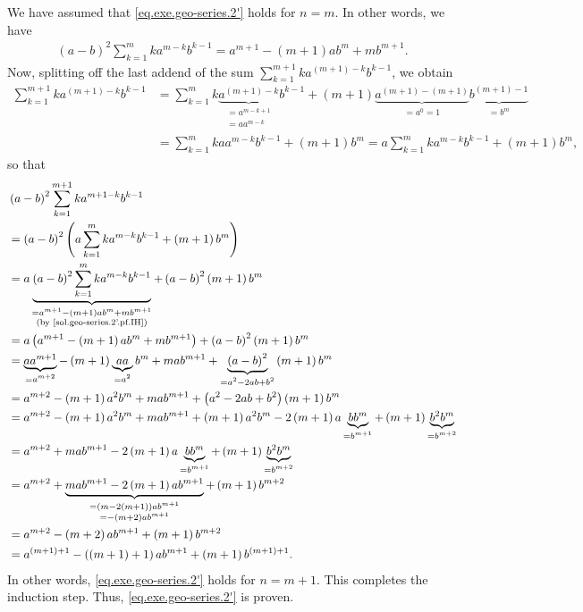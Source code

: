 \documentclass[paper=a4, fontsize=12pt]{scrartcl} %
\newcommand{\tup}[1]{\left( #1 \right)}
\newcommand{\underbrack}[2]{\underbrace{#1}_{\substack{#2}}}
\let\sumnonlimits\sum
\renewcommand{\sum}{\sumnonlimits\limits}
\theoremstyle{plainsl}
\theoremstyle{definition}
\theoremstyle{remark}
\begin{document}
\begin{itemize}
We have assumed that \eqref{eq.exe.geo-series.2'}
holds for $n = m$. In other words, we have
\begin{align}
\tup{a-b}^2 \sum_{k = 1}^m k a^{m-k} b^{k-1}
= a^{m+1} - \tup{m+1} a b^m + m b^{m+1} .
\label{sol.geo-series.2'.pf.IH}
\end{align}
Now, splitting off the last addend of the sum
$\sum_{k = 1}^{m+1} k a^{\tup{m+1}-k} b^{k-1}$, we obtain
\begin{align*}
  \sum_{k = 1}^{m+1} k a^{\tup{m+1}-k} b^{k-1}
& = \sum_{k = 1}^m k \underbrack{a^{\tup{m+1}-k}}{= a^{m-k+1} \\ = a a^{m-k}} b^{k-1}
      + \tup{m+1}
        \underbrack{a^{\tup{m+1}-\tup{m+1}}}{= a^0 = 1}
        \underbrack{b^{\tup{m+1}-1}}{= b^m} \\
& = \sum_{k = 1}^m k a a^{m-k} b^{k-1} + \tup{m+1} b^m
  = a \sum_{k = 1}^m k a^{m-k} b^{k-1} + \tup{m+1} b^m ,
\end{align*}
so that
\begin{align*}
& \tup{a-b}^2 \sum_{k = 1}^{m+1} k a^{{m+1}-k} b^{k-1} \\
& = \tup{a-b}^2 \tup{a \sum_{k = 1}^m k a^{m-k} b^{k-1} + \tup{m+1} b^m} \\
& = a \underbrack{\tup{a-b}^2 \sum_{k = 1}^m k a^{m-k} b^{k-1}}{= a^{m+1} - \tup{m+1} a b^m + m b^{m+1} \\ \text{(by \eqref{sol.geo-series.2'.pf.IH})}}
    + \tup{a-b}^2 \tup{m+1} b^m \\
& = a \tup{a^{m+1} - \tup{m+1} a b^m + m b^{m+1}} + \tup{a-b}^2 \tup{m+1} b^m \\
& = \underbrack{a a^{m+1}}{= a^{m+2}}
    - \tup{m+1} \underbrack{a a}{= a^2} b^m + m a b^{m+1}
    + \underbrack{\tup{a-b}^2}{= a^2 - 2ab + b^2} \tup{m+1} b^m \\
& = a^{m+2} - \tup{m+1} a^2 b^m + m a b^{m+1}
    + \tup{a^2 - 2ab + b^2} \tup{m+1} b^m \\
& = a^{m+2} - \tup{m+1} a^2 b^m + m a b^{m+1}
    + \tup{m+1} a^2 b^m - 2 \tup{m+1} a \underbrack{b b^m}{= b^{m+1}} + \tup{m+1} \underbrack{b^2 b^m}{= b^{m+2}} \\
& = a^{m+2} + m a b^{m+1}
    - 2 \tup{m+1} a \underbrack{b b^m}{= b^{m+1}} + \tup{m+1} \underbrack{b^2 b^m}{= b^{m+2}} \\
& = a^{m+2} + \underbrack{m a b^{m+1} - 2 \tup{m+1} a b^{m+1}}{= \tup{m - 2 \tup{m+1}} a b^{m+1} \\ = - \tup{m+2} a b^{m+1} } + \tup{m+1} b^{m+2} \\
& = a^{m+2} - \tup{m+2} a b^{m+1} + \tup{m+1} b^{m+2} \\
& = a^{\tup{m+1}+1} - \tup{\tup{m+1}+1} a b^{m+1} + \tup{m+1} b^{\tup{m+1}+1} .
\end{align*}
In other words, \eqref{eq.exe.geo-series.2'} holds for $n = m+1$.
This completes the induction step.
Thus, \eqref{eq.exe.geo-series.2'} is proven.

\end{itemize}
\end{document}
